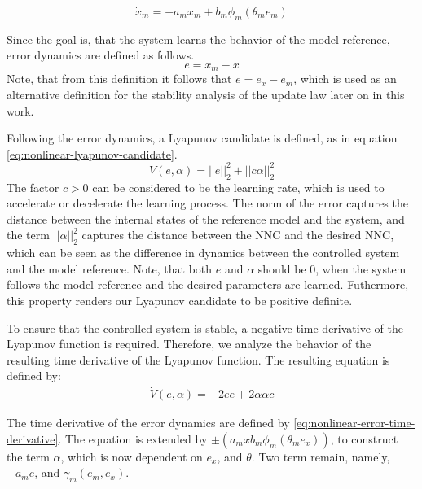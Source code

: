 \begin{equation}
    \dot x_m = -a_mx_m + b_m\phi_m(\theta_m e_m)
    \label{eq:first-order-ref}
\end{equation}

Since the goal is, that the system learns the behavior of the model reference, error dynamics are defined as follows. 
\begin{equation}
    e=x_m-x
    \label{eq:error-dynamics-nonlinear}
\end{equation}
Note, that from this definition it follows that $e=e_x-e_m$, which is used as an alternative definition for the stability analysis of the update law later on in this work.

Following the error dynamics, a Lyapunov candidate is defined, as in equation \eqref{eq:nonlinear-lyapunov-candidate}.
\begin{equation}
    V(e, \alpha) =||e||_2^2 + ||c \alpha||_2^2
    \label{eq:nonlinear-lyapunov-candidate}
\end{equation}
The factor $c>0$ can be considered to be the learning rate, which is used to accelerate or decelerate the learning process. The norm of the error captures the distance between the internal states of the reference model and the system, and the term $||\alpha||_2^2$ captures the distance between the NNC and the desired NNC, which can be seen as the difference in dynamics between the controlled system and the model reference. Note, that both $e$ and $\alpha$ should be $0$, when the system follows the model reference and the desired parameters are learned. Futhermore, this property renders our Lyapunov candidate to be positive definite.

To ensure that the controlled system is stable, a negative time derivative of the Lyapunov function is required. Therefore, we analyze the behavior of the resulting time derivative of the Lyapunov function. The resulting equation is defined by:
\begin{equation}
    \begin{aligned}
    \dot V(e, \alpha) = & 2e\dot e + 2\alpha \dot \alpha c
    \end{aligned}
    \label{eq:nonlinear-lyapunov-derivative}
\end{equation}

The time derivative of the error dynamics are defined by \eqref{eq:nonlinear-error-time-derivative}. The equation is extended by $\pm (a_mx b_m \phi_m(\theta_m e_x))$, to construct the term $\alpha$, which is now dependent on $e_x$, and $\theta$. Two term remain, namely, $-a_me$, and $\gamma_m(e_m, e_x)$.

